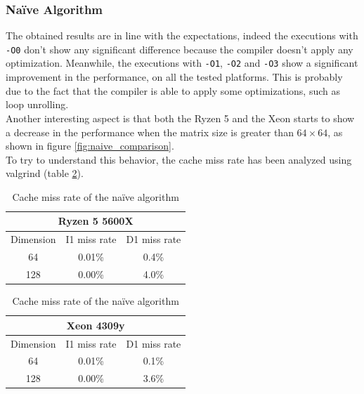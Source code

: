 \documentclass{article}
\begin{document}
\subsubsection{Na\"{i}ve Algorithm}
The obtained results are in line with the expectations, indeed the executions with \texttt{-O0} don't show any significant difference because the compiler 
doesn't apply any optimization. Meanwhile, the executions with \texttt{-O1}, \texttt{-O2} and \texttt{-O3} show a significant improvement in the performance, on all
the tested platforms. This is probably due to the fact that the compiler is able to apply some optimizations, such as loop unrolling. \\
Another interesting aspect is that both the Ryzen 5 and the Xeon starts to show a decrease in the performance when the matrix size is greater than $64 \times 64$, 
as shown in figure \ref{fig:naive_comparison}. \\
To try to understand this behavior, the cache miss rate has been analyzed using valgrind (table \ref{tab:naive_cache_miss}). \\ 
\begin{table}[]
    \centering
    \begin{tabular}{|c|c|c|}
    \hline
    \multicolumn{3}{|c|}{\textbf{Ryzen 5 5600X}} \\
    \hline
    Dimension            & I1 miss rate & D1 miss rate \\ \hline
    64                   & 0.01\%       & 0.4\%        \\ \hline
    128                  & 0.00\%       & 4.0\%        \\ \hline 
    \end{tabular}
    \hspace{2em}
    \begin{tabular}{|c|c|c|}
        \hline
        \multicolumn{3}{|c|}{\textbf{Xeon 4309y}} \\
        \hline
        Dimension            & I1 miss rate & D1 miss rate \\ \hline
        64                   & 0.01\%       & 0.1\%        \\ \hline
        128                  & 0.00\%       & 3.6\%        \\ \hline 
    \end{tabular}
    \caption{Cache miss rate of the na\"{i}ve algorithm}
    \label{tab:naive_cache_miss}
\end{table}
\end{document}
